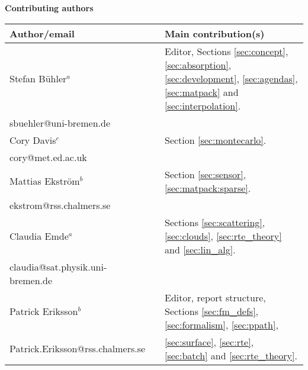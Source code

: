 %
\newpage
\thispagestyle{plain}
%
\begin{center}

{\Large \bf Contributing authors}
\vspace*{20mm}

\begin{tabular}{lp{10mm}l}
\hline
{\bf Author/email} & & {\bf Main contribution(s)} \\
\hline
  Stefan B\"uhler$^a$ & & Editor, Sections \ref{sec:concept},  
     \ref{sec:absorption}, \ref{sec:development}, \ref{sec:agendas},
     \ref{sec:matpack} and \ref{sec:interpolation}.\\
  sbuehler@uni-bremen.de & &        \\
\hline
  Cory Davis$^c$ & & Section \ref{sec:montecarlo}. \\
  cory@met.ed.ac.uk & & \\
\hline
  Mattias Ekstr\"om$^b$ & & Section \ref{sec:sensor}, 
     \ref{sec:matpack:sparse}. \\
  ekstrom@rss.chalmers.se & & \\
\hline
 Claudia Emde$^a$ & & Sections \ref{sec:scattering},
 \ref{sec:clouds}, \ref{sec:rte_theory} and \ref{sec:lin_alg}.\\
  claudia@sat.physik.uni-bremen.de & & \\
\hline
  Patrick Eriksson$^b$ &  & Editor, report structure, 
    Sections \ref{sec:fm_defs}, \ref{sec:formalism}, \ref{sec:ppath}, \\
  Patrick.Eriksson@rss.chalmers.se & & 
    \ref{sec:surface}, \ref{sec:rte}, \ref{sec:batch} and 
    \ref{sec:rte_theory}.\\


\end{tabular}
\end{center}
